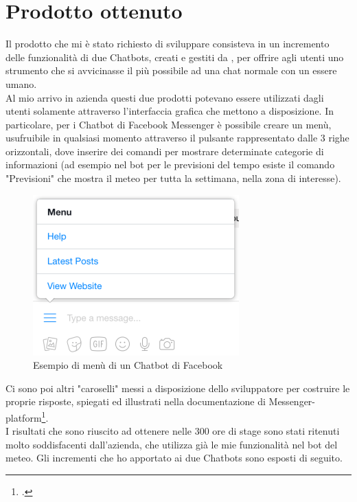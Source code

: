 \section{Prodotto ottenuto}
Il prodotto che mi è stato richiesto di sviluppare consisteva in un incremento delle funzionalità di due \glspl{Chatbot}, creati e gestiti da \azienda{}, per offrire agli utenti uno strumento che si avvicinasse il più possibile ad una chat normale con un essere umano.\\
Al mio arrivo in azienda questi due prodotti potevano essere utilizzati dagli utenti solamente attraverso l'interfaccia grafica che mettono a disposizione. In particolare, per i \gls{Chatbot} di Facebook Messenger è possibile creare un menù, usufruibile in qualsiasi momento attraverso il pulsante rappresentato dalle 3 righe orizzontali, dove inserire dei comandi per mostrare determinate categorie di informazioni (ad esempio nel bot per le previsioni del tempo esiste il comando "Previsioni" che mostra il meteo per tutta la settimana, nella zona di interesse). 
\begin{figure}[!h]
	\centering
	\includegraphics[scale=0.6]{../Immagini/menu.png}
	\caption{Esempio di menù di un \gls{Chatbot} di Facebook}
\end{figure}

Ci sono poi altri "caroselli" messi a disposizione dello sviluppatore per costruire le proprie risposte, spiegati ed illustrati nella documentazione di Messenger-platform\footcite{messenger}.\\

I risultati che sono riuscito ad ottenere nelle 300 ore di stage sono stati ritenuti molto soddisfacenti dall'azienda, che utilizza già le mie funzionalità nel bot del meteo. Gli incrementi che ho apportato ai due \glspl{Chatbot} sono esposti di seguito. 

